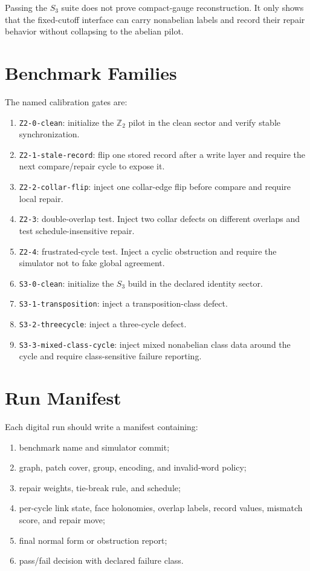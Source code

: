 \documentclass[11pt]{article}
\begin{document}
Passing the \(S_3\) suite does not prove compact-gauge reconstruction. It only shows that the
fixed-cutoff interface can carry nonabelian labels and record their repair behavior without
collapsing to the abelian pilot.

\section{Benchmark Families}

The named calibration gates are:
\begin{enumerate}[leftmargin=2em]
\item \texttt{Z2-0-clean}: initialize the \(\mathbb Z_2\) pilot in the clean sector and verify
stable synchronization.
\item \texttt{Z2-1-stale-record}: flip one stored record after a write layer and require the
next compare/repair cycle to expose it.
\item \texttt{Z2-2-collar-flip}: inject one collar-edge flip before compare and require local
repair.
\item \texttt{Z2-3}: double-overlap test. Inject two collar defects on different overlaps and test
schedule-insensitive repair.
\item \texttt{Z2-4}: frustrated-cycle test. Inject a cyclic obstruction and require the simulator
not to fake global agreement.
\item \texttt{S3-0-clean}: initialize the \(S_3\) build in the declared identity sector.
\item \texttt{S3-1-transposition}: inject a transposition-class defect.
\item \texttt{S3-2-threecycle}: inject a three-cycle defect.
\item \texttt{S3-3-mixed-class-cycle}: inject mixed nonabelian class data around the cycle and
require class-sensitive failure reporting.
\end{enumerate}

\section{Run Manifest}

Each digital run should write a manifest containing:
\begin{enumerate}[leftmargin=2em]
\item benchmark name and simulator commit;
\item graph, patch cover, group, encoding, and invalid-word policy;
\item repair weights, tie-break rule, and schedule;
\item per-cycle link state, face holonomies, overlap labels, record values, mismatch score, and
repair move;
\item final normal form or obstruction report;
\item pass/fail decision with declared failure class.
\end{enumerate}
\end{document}
